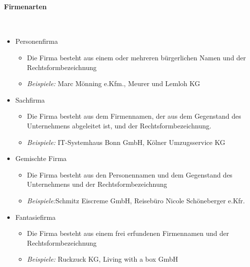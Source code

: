 \paragraph{Firmenarten}~\\
\begin{itemize}
	\item Personenfirma
	\begin{itemize}
		\item Die Firma besteht aus einem oder mehreren bürgerlichen Namen und der Rechtsformbezeichnung
		\item  {\it Beispiele:} Marc Mönning e.Kfm., Meurer und Lemloh KG
	\end{itemize}
	\item Sachfirma
	\begin{itemize}
		\item Die Firma besteht aus dem Firmennamen, der aus dem Gegenstand des Unternehmens abgeleitet ist, und der Rechtsformbezeichnung.
		\item  {\it Beispiele:} IT-Systemhaus Bonn GmbH, Kölner Umzugsservice KG
	\end{itemize}
	\item Gemischte Firma
	\begin{itemize}
		\item Die Firma besteht aus den Personennamen und dem Gegenstand des Unternehmens und der Rechtsformbezeichnung
		\item  {\it Beispiele:}Schmitz Eiscreme GmbH, Reisebüro Nicole Schöneberger e.Kfr.
	\end{itemize}
	\item Fantasiefirma
	\begin{itemize}
		\item Die Firma besteht aus einem frei erfundenen Firmennamen und der Rechtsformbezeichnung
		\item  {\it Beispiele:} Ruckzuck KG, Living with a box GmbH
	\end{itemize}
\end{itemize}


